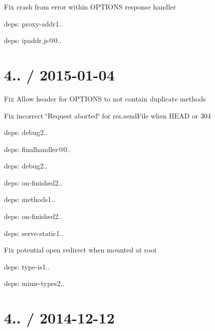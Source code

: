 {\ttfamily }

{\ttfamily 
\begin{DoxyItemize}
\item Fix crash from error within {\ttfamily O\+P\+T\+I\+O\+NS} response handler
\item deps\+: proxy-\/addr1..
\begin{DoxyItemize}
\item deps\+: ipaddr.\+js@0..
\end{DoxyItemize}
\end{DoxyItemize}}

{\ttfamily \section*{4.. / 2015-\/01-\/04 }}

{\ttfamily }

{\ttfamily 
\begin{DoxyItemize}
\item Fix {\ttfamily Allow} header for {\ttfamily O\+P\+T\+I\+O\+NS} to not contain duplicate methods
\item Fix incorrect \char`\"{}\+Request aborted\char`\"{} for {\ttfamily res.\+send\+File} when {\ttfamily H\+E\+AD} or 304
\item deps\+: debug2..
\item deps\+: finalhandler@0..
\begin{DoxyItemize}
\item deps\+: debug2..
\item deps\+: on-\/finished2..
\end{DoxyItemize}
\item deps\+: methods1..
\item deps\+: on-\/finished2..
\item deps\+: serve-\/static1..
\begin{DoxyItemize}
\item Fix potential open redirect when mounted at root
\end{DoxyItemize}
\item deps\+: type-\/is1..
\begin{DoxyItemize}
\item deps\+: mime-\/types2..
\end{DoxyItemize}
\end{DoxyItemize}}

{\ttfamily \section*{4.. / 2014-\/12-\/12 }}


